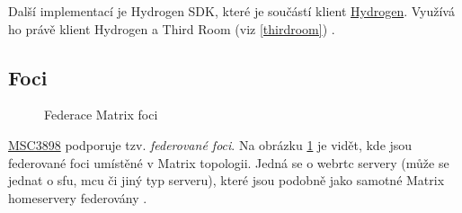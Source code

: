 Další implementací je Hydrogen SDK, které je součástí klient
\href{https://github.com/vector-im/hydrogen-web}{Hydrogen}. Využívá ho právě
klient Hydrogen a Third Room (viz \ref{thirdroom}) \parencite{GitHub-Hydrogen}.

\subsection{Foci}\label{foci}

\begin{figure}[H]
    \centering
    \caption{Federace Matrix foci}
    \label{federatedFoci}
\end{figure}

\href{https://github.com/matrix-org/matrix-spec-proposals/pull/3898}{MSC3898}
podporuje tzv. \textit{federované foci}. Na obrázku \ref{federatedFoci} je
vidět, kde jsou federované foci umístěné v Matrix topologii. Jedná se o
\gls{webrtc} servery (může se jednat o \gls{sfu}, \gls{mcu} či jiný typ
serveru), které jsou podobně jako samotné Matrix homeservery federovány
\parencite{GitHub-MSC3898}.


